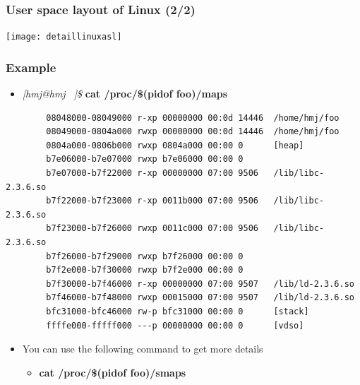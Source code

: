 \documentclass[CJKutf8,xcolor=pdftex,dvipsnames,table]{beamer}
\begin{document}
\begin{CJK*}{UTF8}{song}
  \begin{frame}
    \frametitle{User space layout of Linux (2/2)} \pause
    \begin{center}
      \texttt{[image: detaillinuxasl]}
    \end{center}
  \end{frame}  
  
  \begin{frame}[fragile]
    \frametitle{Example} \pause
    \begin{itemize}
    \item{\emph{[hmj@hmj ~]\$ }\textbf{cat /proc/\$(pidof foo)/maps}} \pause
    \end{itemize}
    {\tiny
\begin{verbatim}
        08048000-08049000 r-xp 00000000 00:0d 14446  /home/hmj/foo
        08049000-0804a000 rwxp 00000000 00:0d 14446  /home/hmj/foo
        0804a000-0806b000 rwxp 0804a000 00:00 0      [heap]
        b7e06000-b7e07000 rwxp b7e06000 00:00 0
        b7e07000-b7f22000 r-xp 00000000 07:00 9506   /lib/libc-2.3.6.so
        b7f22000-b7f23000 r-xp 0011b000 07:00 9506   /lib/libc-2.3.6.so
        b7f23000-b7f26000 rwxp 0011c000 07:00 9506   /lib/libc-2.3.6.so
        b7f26000-b7f29000 rwxp b7f26000 00:00 0
        b7f2e000-b7f30000 rwxp b7f2e000 00:00 0
        b7f30000-b7f46000 r-xp 00000000 07:00 9507   /lib/ld-2.3.6.so
        b7f46000-b7f48000 rwxp 00015000 07:00 9507   /lib/ld-2.3.6.so
        bfc31000-bfc46000 rw-p bfc31000 00:00 0      [stack]
        ffffe000-fffff000 ---p 00000000 00:00 0      [vdso]
\end{verbatim}
    } \pause
    \begin{itemize}
    \item{You can use the following command to get more details} \pause
      \begin{itemize}
      \item{\textbf{cat /proc/\$(pidof foo)/smaps}}
      \end{itemize}
    \end{itemize}
\end{frame}
  

\end{CJK*}
\end{document}
